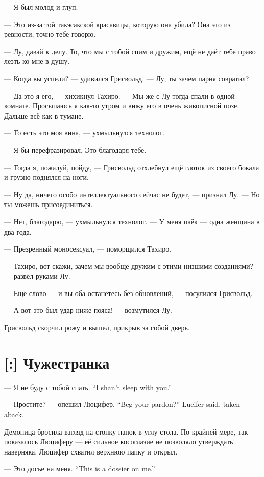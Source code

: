 --- Я был молод и глуп.

--- Это из-за той такэсакской красавицы, которую она убила?
Она это из ревности, точно тебе говорю.

--- Лу, давай к делу.
То, что мы с тобой спим и дружим, ещё не даёт тебе право лезть ко мне в душу.

--- Когда вы успели? --- удивился Грисвольд.
--- Лу, ты зачем парня совратил?

--- Да это я его, --- хихикнул Тахиро.
--- Мы же с Лу тогда спали в одной комнате.
Просыпаюсь я как-то утром и вижу его в очень живописной позе.
Дальше всё как в тумане.

--- То есть это моя вина, --- ухмыльнулся технолог.

--- Я бы перефразировал.
Это благодаря тебе.

--- Тогда я, пожалуй, пойду, --- Грисвольд отхлебнул ещё глоток из своего бокала и грузно поднялся на ноги.

--- Ну да, ничего особо интеллектуального сейчас не будет, --- признал Лу.
--- Но ты можешь присоединиться.

--- Нет, благодарю, --- ухмыльнулся технолог.
--- У меня паёк --- одна женщина в два года.

--- Презренный моносексуал, --- поморщился Тахиро.

--- Тахиро, вот скажи, зачем мы вообще дружим с этими низшими созданиями? --- развёл руками Лу.

--- Ещё слово --- и вы оба останетесь без обновлений, --- посулился Грисвольд.

--- А вот это был удар ниже пояса! --- возмутился Лу.

Грисвольд скорчил рожу и вышел, прикрыв за собой дверь.

\section{[:] Чужестранка}

{--- Я не буду с тобой спать.}
{``I shan't sleep with you.''}

{--- Простите? --- опешил Люцифер.}
{``Beg your pardon?'' Lucifer said, taken aback.}

Демоница бросила взгляд на стопку папок в углу стола.
По крайней мере, так показалось Люциферу --- её сильное косоглазие не позволяло утверждать наверняка.
Люцифер схватил верхнюю папку и открыл.

{--- Это досье на меня.}
{``This is a dossier on me.''}

